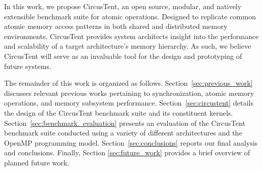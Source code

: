 
In this work, we propose CircusTent, an open source, modular, and natively extensible benchmark suite for atomic operations.
Designed to replicate common atomic memory access patterns in both shared and distributed memory environments, CircusTent provides system architects insight into the performance and scalability of a target architecture's memory hierarchy.
As such, we believe CircusTent will serve as an invaluable tool for the design and prototyping of future systems.

The remainder of this work is organized as follows.
Section~\ref{sec:previous_work} discusses relevant previous works pertaining to synchronization, atomic memory operations, and memory subsystem performance.
Section~\ref{sec:circustent} details the design of the CircusTent benchmark suite and its constituent kernels.
Section~\ref{sec:benchmark_evaluation} presents an evaluation of the CircusTent benchmark suite conducted using a variety of different architectures and the OpenMP programming model.
Section~\ref{sec:conclusions} reports our final analysis and conclusions.
Finally, Section \ref{sec:future_work} provides a brief overview of planned future work.